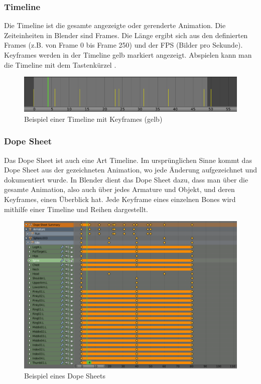 \subsubsection{Timeline}
Die Timeline ist die gesamte angezeigte oder gerenderte Animation. Die Zeiteinheiten in Blender sind Frames.
Die Länge ergibt sich aus den definierten Frames (z.B. von Frame 0 bis Frame 250) und der FPS (Bilder pro Sekunde).
Keyframes werden in der Timeline gelb markiert angezeigt. Abspielen kann man die Timeline mit dem Tastenkürzel .

\begin{figure}[H]
    \centering

    \includegraphics[width=.8\textwidth]{images/animation_timeline.PNG}
    \caption{Beispiel einer Timeline mit Keyframes (gelb)}
\end{figure}

\subsubsection{Dope Sheet}
Das Dope Sheet ist auch eine Art Timeline. Im ursprünglichen Sinne kommt das Dope Sheet aus der gezeichneten Animation,
wo jede Änderung aufgezeichnet und dokumentiert wurde. In Blender dient das Dope Sheet dazu, dass man über die gesamte Animation,
also auch über jedes Armature und Objekt, und deren Keyframes, einen Überblick hat. Jede Keyframe eines einzelnen Bones wird mithilfe einer Timeline und Reihen dargestellt.

\begin{figure}[H]
    \centering

    \includegraphics[width=.8\textwidth]{images/animation_dope_sheet.PNG}
    \caption{Beispiel eines Dope Sheets}
\end{figure}


